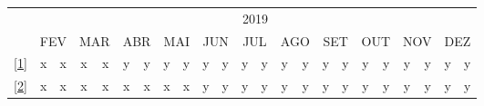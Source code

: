 \centering
\begin{table}[!htb]
\centering
\begin{tabular}{|c|c|c|c|c|c|c|c|c|c|c|c|c|c|c|c|c|c|c|c|c|c|c|}
\hline
\multirow{2}{}{}&\multicolumn{22}{c|}{2019}\\\cline{2-23}
&\multicolumn{2}{c|}{FEV}&\multicolumn{2}{c|}{MAR}&\multicolumn{2}{c|}{ABR}&\multicolumn{2}{c|}{MAI}&\multicolumn{2}{c|}{JUN}&\multicolumn{2}{c|}{JUL}&\multicolumn{2}{c|}{AGO}&\multicolumn{2}{c|}{SET}&\multicolumn{2}{c|}{OUT}&\multicolumn{2}{c|}{NOV}&\multicolumn{2}{c|}{DEZ}\\
\hline
\ref{1}&\cellcolor{midgray}\textcolor{midgray}{x}&\cellcolor{midgray}\textcolor{midgray}{x}&\cellcolor{midgray}\textcolor{midgray}{x}&\cellcolor{midgray}\textcolor{midgray}{x}&\cellcolor{nocolor}\textcolor{nocolor}{y}&\cellcolor{nocolor}\textcolor{nocolor}{y}&\cellcolor{nocolor}\textcolor{nocolor}{y}&\cellcolor{nocolor}\textcolor{nocolor}{y}&\cellcolor{nocolor}\textcolor{nocolor}{y}&\cellcolor{nocolor}\textcolor{nocolor}{y}&\cellcolor{nocolor}\textcolor{nocolor}{y}&\cellcolor{nocolor}\textcolor{nocolor}{y}&\cellcolor{nocolor}\textcolor{nocolor}{y}&\cellcolor{nocolor}\textcolor{nocolor}{y}&\cellcolor{nocolor}\textcolor{nocolor}{y}&\cellcolor{nocolor}\textcolor{nocolor}{y}&\cellcolor{nocolor}\textcolor{nocolor}{y}&\cellcolor{nocolor}\textcolor{nocolor}{y}&\cellcolor{nocolor}\textcolor{nocolor}{y}&\cellcolor{nocolor}\textcolor{nocolor}{y}&\cellcolor{nocolor}\textcolor{nocolor}{y}&\cellcolor{nocolor}\textcolor{nocolor}{y}\\
\hline

\ref{2}&\cellcolor{nocolor}\textcolor{nocolor}{x}&\cellcolor{nocolor}\textcolor{nocolor}{x}&\cellcolor{midgray}\textcolor{midgray}{x}&\cellcolor{midgray}\textcolor{midgray}{x}&\cellcolor{midgray}\textcolor{midgray}{x}&\cellcolor{midgray}\textcolor{midgray}{x}&\cellcolor{midgray}\textcolor{midgray}{x}&\cellcolor{midgray}\textcolor{midgray}{x}&\cellcolor{midgray}\textcolor{midgray}{y}&\cellcolor{midgray}\textcolor{midgray}{y}&\cellcolor{nocolor}\textcolor{nocolor}{y}&\cellcolor{nocolor}\textcolor{nocolor}{y}&\cellcolor{nocolor}\textcolor{nocolor}{y}&\cellcolor{nocolor}\textcolor{nocolor}{y}&\cellcolor{nocolor}\textcolor{nocolor}{y}&\cellcolor{nocolor}\textcolor{nocolor}{y}&\cellcolor{nocolor}\textcolor{nocolor}{y}&\cellcolor{nocolor}\textcolor{nocolor}{y}&\cellcolor{nocolor}\textcolor{nocolor}{y}&\cellcolor{nocolor}\textcolor{nocolor}{y}&\cellcolor{nocolor}\textcolor{nocolor}{y}&\cellcolor{nocolor}\textcolor{nocolor}{y}\\
\hline


\end{tabular}
\end{table}
